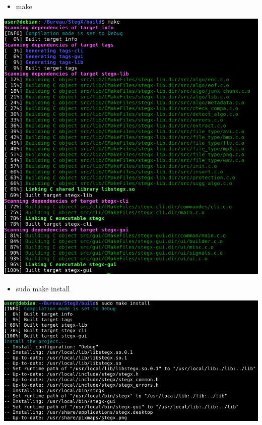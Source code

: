 \documentclass[11pt]{article}
\begin{document}
\begin{itemize}
\item make
\end{itemize}

\hspace{2cm}
\vspace{0.5cm}
\includegraphics[scale=0.5]{pictures/make.png}


\begin{itemize}
\item sudo make install
\end{itemize}

\hspace{1cm}
\vspace{0.5cm}
\includegraphics[scale=0.5]{pictures/install.png}
\end{document}
